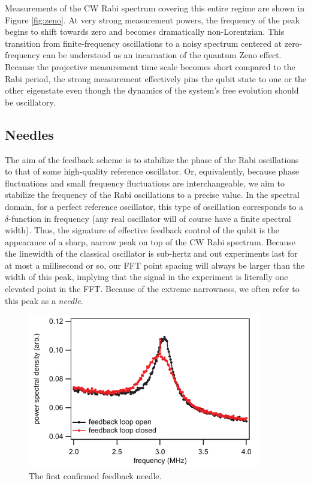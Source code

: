 Measurements of the CW Rabi spectrum covering this entire regime are shown in Figure \ref{fig:zeno}.  At very strong measurement powers, the frequency of the peak begins to shift towards zero and becomes dramatically non-Lorentzian.  This transition from finite-frequency oscillations to a noisy spectrum centered at zero-frequency can be understood as an incarnation of the quantum Zeno effect.  Because the projective measurement time scale becomes short compared to the Rabi period, the strong measurement effectively pins the qubit state to one or the other eigenstate even though the dynamics of the system's free evolution should be oscillatory.

\subsection{Needles}

The aim of the feedback scheme is to stabilize the phase of the Rabi oscillations to that of some high-quality reference oscillator.  Or, equivalently, because phase fluctuations and small frequency fluctuations are interchangeable, we aim to stabilize the frequency of the Rabi oscillations to a precise value.  In the spectral domain, for a perfect reference oscillator, this type of oscillation corresponds to a $\delta$-function in frequency (any real oscillator will of course have a finite spectral width).  Thus, the signature of effective feedback control of the qubit is the appearance of a sharp, narrow peak on top of the CW Rabi spectrum.  Because the linewidth of the classical oscillator is sub-hertz and out experiments last for at most a millisecond or so, our FFT point spacing will always be larger than the width of this peak, implying that the signal in the experiment is literally one elevated point in the FFT.  Because of the extreme narrowness, we often refer to this peak as a \textit{needle}.

\begin{figure}
\begin{center}
	\includegraphics[width = 4in]{qfb_results_chapter/first_fb}
\end{center}
\caption[First observation of feedback stabilization]{The first confirmed feedback needle.}
\label{fig:first_fb}
\end{figure}

